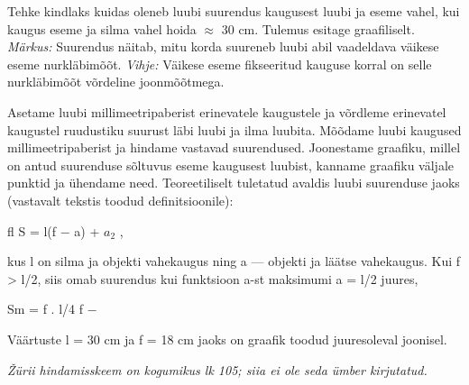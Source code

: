 
Tehke kindlaks kuidas oleneb luubi suurendus kaugusest luubi ja eseme vahel, kui kaugus eseme ja silma vahel hoida $\approx$ 30 cm. Tulemus esitage graafiliselt.
\textit{Märkus:} Suurendus näitab, mitu korda suureneb luubi abil vaadeldava väikese eseme nurkläbimõõt.
\textit{Vihje:} Väikese eseme fikseeritud kauguse korral on selle nurkläbimõõt võrdeline joonmõõtmega.

\hint

\solu
Asetame luubi millimeetripaberist erinevatele kaugustele ja võrdleme erinevatel kaugustel ruudustiku suurust läbi luubi ja ilma luubita. Mõõdame luubi kaugused millimeetripaberist ja hindame vastavad suurendused. Joonestame graafiku, millel on antud suurenduse sõltuvus eseme kaugusest luubist, kanname graafiku väljale punktid ja ühendame need. Teoreetiliselt tuletatud avaldis luubi suurenduse jaoks (vastavalt tekstis toodud definitsioonile):

fl S = l(f $-$ a) + $a_2$ ,

kus l on silma ja objekti vahekaugus ning a --- objekti ja läätse vahekaugus. Kui f > l/2, siis omab suurendus kui funktsioon a-st maksimumi a = l/2 juures,

Sm = f . l/4 f $-$

Väärtuste l = 30 cm ja f = 18 cm jaoks on graafik toodud juuresoleval joonisel.

\textit{Žürii hindamisskeem on kogumikus lk 105; siia ei ole seda ümber kirjutatud.}
\probend
